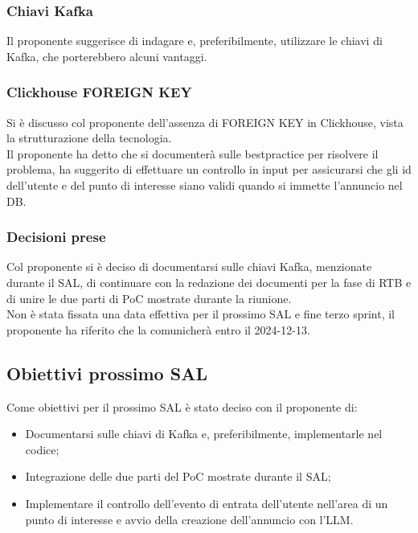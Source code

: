 \documentclass[12pt]{article}
\begin{document}
\subsubsection{Chiavi Kafka}
Il proponente suggerisce di indagare e, preferibilmente, utilizzare le chiavi di Kafka, che porterebbero alcuni vantaggi.

\subsubsection{Clickhouse FOREIGN KEY}
Si è discusso col proponente dell'assenza di FOREIGN KEY in Clickhouse, vista la strutturazione della tecnologia.\\
Il proponente ha detto che si documenterà sulle bestpractice per risolvere il problema, ha suggerito di effettuare un controllo in input per assicurarsi che gli id dell'utente e del punto di interesse siano validi quando si immette l'annuncio nel DB.

\subsubsection{Decisioni prese}
Col proponente si è deciso di documentarsi sulle chiavi Kafka, menzionate durante il SAL, di continuare con la redazione dei documenti per la fase di RTB e di unire le due parti di PoC mostrate durante la riunione.\\
Non è stata fissata una data effettiva per il prossimo SAL e fine terzo sprint, il proponente ha riferito che la comunicherà entro il 2024-12-13.
\newpage
\subsection{Obiettivi prossimo SAL}
Come obiettivi per il prossimo SAL è stato deciso con il proponente di:
\begin{itemize}
\item Documentarsi sulle chiavi di Kafka e, preferibilmente, implementarle nel codice;
\item Integrazione delle due parti del PoC mostrate durante il SAL;
  \item Implementare il controllo dell'evento di entrata dell'utente nell'area di un punto di interesse e avvio della creazione dell'annuncio con l'LLM.
\end{itemize}
\end{document}
